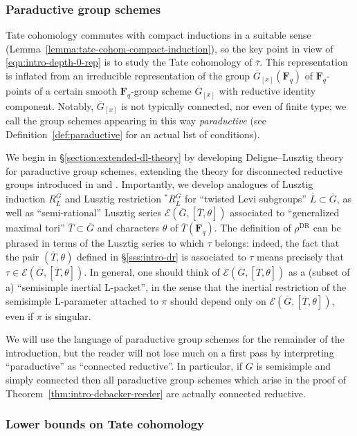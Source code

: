 \documentclass[reqno]{amsart}
\numberwithin{equation}{subsection}
\newcommand{\F}{\mathbf{F}}
\newcommand{\ol}[1]{\overline{#1}}
\newcommand\cE{\mathcal{E}}
\DeclareMathOperator{\DR}{DR}
\theoremstyle{remark}
\numberwithin{equation}{subsection}
\numberwithin{figure}{subsection}
\begin{document}
\subsubsection{Paraductive group schemes}

Tate cohomology commutes with compact inductions in a suitable sense (Lemma~\ref{lemma:tate-cohom-compact-induction}), so the key point in view of \eqref{eqn:intro-depth-0-rep} is to study the Tate cohomology of $\ol\tau$. This representation is inflated from an irreducible representation of the group $\ol G_{[x]}(\F_q)$ of $\F_q$-points of a certain smooth $\F_q$-group scheme $\ol G_{[x]}$ with reductive identity component. Notably, $\ol G_{[x]}$ is not typically connected, nor even of finite type; we call the group schemes appearing in this way \emph{paraductive} (see Definition~\ref{def:paraductive} for an actual list of conditions).

We begin in \S\ref{section:extended-dl-theory} by developing Deligne--Lusztig theory \cite{DL76} for paraductive group schemes, extending the theory for disconnected reductive groups introduced in \cite{DM94} and \cite{Kal21b}. Importantly, we develop analogues of Lusztig induction $R_{\ol L}^{\ol G}$ and Lusztig restriction $^*R^{\ol G}_{\ol L}$ for ``twisted Levi subgroups'' $\ol L \subset \ol G$, as well as ``semi-rational'' Lusztig series $\cE(\ol G, [\ol T, \theta])$ associated to ``generalized maximal tori'' $\ol T \subset \ol G$ and characters $\theta$ of $\ol T(\F_q)$. The definition of $\rho^{\DR}$ can be phrased in terms of the Lusztig series to which $\tau$ belongs: indeed, the fact that the pair $(\ol T, \theta)$ defined in \S\ref{sss:intro-dr} is associated to $\tau$ means precisely that $\tau \in \cE(\ol G, [\ol T, \theta])$. In general, one should think of $\cE(\ol G, [\ol T, \theta])$ as a (subset of a) ``semisimple inertial L-packet'', in the sense that the inertial restriction of the semisimple L-parameter attached to $\pi$ should depend only on $\cE(\ol G, [\ol T, \theta])$, even if $\pi$ is singular.

We will use the language of paraductive group schemes for the remainder of the introduction, but the reader will not lose much on a first pass by interpreting ``paraductive'' as ``connected reductive''. In particular, if $G$ is semisimple and simply connected then all paraductive group schemes which arise in the proof of Theorem~\ref{thm:intro-debacker-reeder} are actually connected reductive.

\subsubsection{Lower bounds on Tate cohomology}
\end{document}
